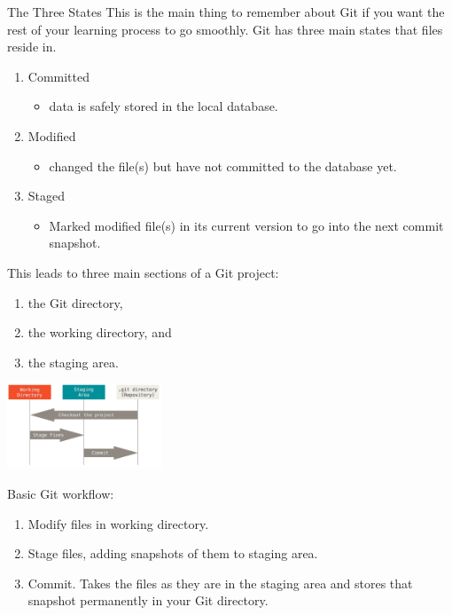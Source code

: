 \begin{frame}[t,allowframebreaks]{The Three States}
  This is the main thing to remember about Git if you want the rest of your
  learning process to go smoothly.  Git has three main states that files reside
  in.

  \begin{enumerate}
    \item Committed
      \begin{itemize}
        \item data is safely stored in the local database.
      \end{itemize}
    \item Modified
      \begin{itemize}
        \item changed the file(s) but have not committed to the database yet.
      \end{itemize}
    \item Staged
      \begin{itemize}
        \item Marked modified file(s) in its current version to go into the next
          commit snapshot.
      \end{itemize}
  \end{enumerate}

  This leads to three main sections of a Git project:
  \begin{enumerate}
    \item the Git directory,
    \item the working directory, and
    \item the staging area.
  \end{enumerate}

  \pagebreak

  \includegraphics[height=1.0in]{../images/02-getting-started/areas.png}

  Basic Git workflow:
  \begin{enumerate}
    \item Modify files in working directory.
    \item Stage files, adding snapshots of them to staging area.
    \item Commit.  Takes the files as they are in the staging area and stores
      that snapshot permanently in your Git directory.
  \end{enumerate} 
\end{frame}

